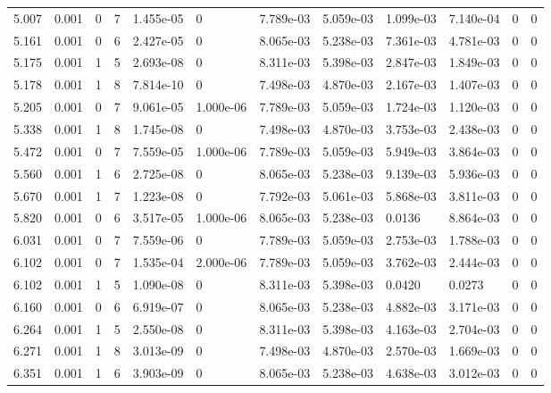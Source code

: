 \documentclass[preview]{standalone}
\begin{document}
{{{\begin{tabular}{L{1.2cm}C{1.2cm} C{0.3cm}C{0.5cm} C{1.4cm}C{1.4cm} C{1.4cm}C{1.4cm} C{1.6cm}C{1.6cm} C{1.6cm}C{1.6cm}}
  5.007  &  0.001  & 0     &  7 &  1.455e-05  & 0  &  7.789e-03&   5.059e-03& 1.099e-03 & 7.140e-04   &  0 & 0  \\ 
  5.161  &  0.001  & 0     &  6 &  2.427e-05  & 0  &  8.065e-03&   5.238e-03& 7.361e-03 & 4.781e-03   &  0 & 0  \\ 
  5.175  &  0.001  & 1     &  5 &  2.693e-08  & 0  &  8.311e-03&   5.398e-03& 2.847e-03 & 1.849e-03   &  0 & 0  \\ 
  5.178  &  0.001  & 1     &  8 &  7.814e-10  & 0  &  7.498e-03&   4.870e-03& 2.167e-03 & 1.407e-03   &  0 & 0  \\ 
  5.205  &  0.001  & 0     &  7 &  9.061e-05  & 1.000e-06  &  7.789e-03&   5.059e-03& 1.724e-03 & 1.120e-03   &  0 & 0  \\ 
  5.338  &  0.001  & 1     &  8 &  1.745e-08  & 0  &  7.498e-03&   4.870e-03& 3.753e-03 & 2.438e-03   &  0 & 0  \\ 
  5.472  &  0.001  & 0     &  7 &  7.559e-05  & 1.000e-06  &  7.789e-03&   5.059e-03& 5.949e-03 & 3.864e-03   &  0 & 0  \\ 
  5.560  &  0.001  & 1     &  6 &  2.725e-08  & 0  &  8.065e-03&   5.238e-03& 9.139e-03 & 5.936e-03   &  0 & 0  \\ 
  5.670  &  0.001  & 1     &  7 &  1.223e-08  & 0  &  7.792e-03&   5.061e-03& 5.868e-03 & 3.811e-03   &  0 & 0  \\ 
  5.820  &  0.001  & 0     &  6 &  3.517e-05  & 1.000e-06  &  8.065e-03&   5.238e-03& 0.0136 & 8.864e-03   &  0 & 0  \\ 
  6.031  &  0.001  & 0     &  7 &  7.559e-06  & 0  &  7.789e-03&   5.059e-03& 2.753e-03 & 1.788e-03   &  0 & 0  \\ 
  6.102  &  0.001  & 0     &  7 &  1.535e-04  & 2.000e-06  &  7.789e-03&   5.059e-03& 3.762e-03 & 2.444e-03   &  0 & 0  \\ 
  6.102  &  0.001  & 1     &  5 &  1.090e-08  & 0  &  8.311e-03&   5.398e-03& 0.0420 & 0.0273   &  0 & 0  \\ 
  6.160  &  0.001  & 0     &  6 &  6.919e-07  & 0  &  8.065e-03&   5.238e-03& 4.882e-03 & 3.171e-03   &  0 & 0  \\ 
  6.264  &  0.001  & 1     &  5 &  2.550e-08  & 0  &  8.311e-03&   5.398e-03& 4.163e-03 & 2.704e-03   &  0 & 0  \\ 
  6.271  &  0.001  & 1     &  8 &  3.013e-09  & 0  &  7.498e-03&   4.870e-03& 2.570e-03 & 1.669e-03   &  0 & 0  \\ 
  6.351  &  0.001  & 1     &  6 &  3.903e-09  & 0  &  8.065e-03&   5.238e-03& 4.638e-03 & 3.012e-03   &  0 & 0  \\ 

\end{tabular}}}}
\end{document}
